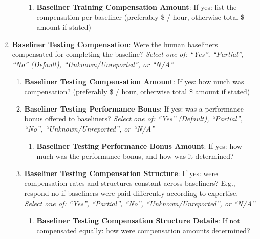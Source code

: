 \documentclass{article}
\begin{document}
\begin{enumerate}[leftmargin=30pt, topsep=0pt, itemsep=0pt]
\begin{enumerate}
        \begin{enumerate}
            \item \textbf{Baseliner Training Compensation Amount}: If yes: list the compensation per baseliner (preferably \$ / hour, otherwise total \$ amount if stated)
        \end{enumerate}
    \end{enumerate}
    
    \item \textbf{Baseliner Testing Compensation}: Were the human baseliners compensated for completing the baseline?
    \newline \textit{Select one of: ``Yes'', ``Partial'', ``No'' (Default), ``Unknown/Unreported'', or ``N/A''}
    \begin{enumerate}
        \item \textbf{Baseliner Testing Compensation Amount}: If yes: how much was compensation? (preferably \$ / hour, otherwise total \$ amount if stated)

        \item \textbf{Baseliner Testing Performance Bonus}: If yes: was a performance bonus offered to baseliners?
        \newline \textit{Select one of: \ul{``Yes'' (Default)}, ``Partial'', ``No'', ``Unknown/Unreported'', or ``N/A''}

        \begin{enumerate}
            \item \textbf{Baseliner Testing Performance Bonus Amount}: If yes: how much was the performance bonus, and how was it determined?
        \end{enumerate}
        
        \item \textbf{Baseliner Testing Compensation Structure}: If yes: were compensation rates and structures constant across baseliners? E.g., respond no if baseliners were paid differently according to expertise.
        \newline \textit{Select one of: ``Yes'', ``Partial'', ``No'', ``Unknown/Unreported'', or ``N/A''}
        \begin{enumerate}
            \item \textbf{Baseliner Testing Compensation Structure Details}: If not compensated equally: how were compensation amounts determined?
        \end{enumerate}
    \end{enumerate}
\end{enumerate}
\end{document}
